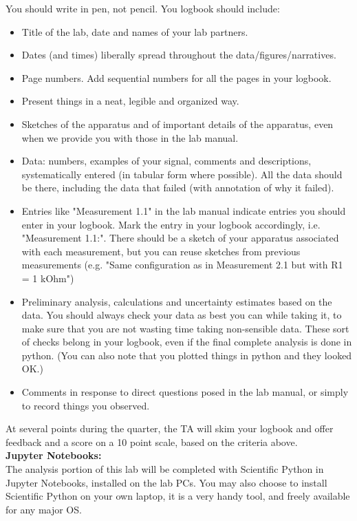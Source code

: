 \documentclass[12pt]{article}
\begin{document}
You should write in pen, not pencil.  You logbook should include:
\begin{itemize}
\item Title of the lab, date and names of your lab partners.  
\item Dates (and times) liberally spread throughout the data/figures/narratives.
\item Page numbers. Add sequential numbers for all the pages in your logbook. 
\item Present things in a neat, legible and organized way.
\item Sketches of the apparatus and of important details of the apparatus, even when we provide you with those in the lab manual.
\item Data: numbers, examples of your signal, comments and descriptions, systematically entered (in tabular form where possible). All the data should be there, including the data that failed (with annotation of why it failed). 
\item Entries like "Measurement 1.1" in the lab manual indicate entries you should enter in your logbook. Mark the entry in your logbook accordingly, i.e. "Measurement 1.1:".
There should be a sketch of your apparatus associated with each measurement, but you can reuse sketches from previous measurements (e.g. "Same configuration as in Measurement 2.1 but with R1 = 1 kOhm")
\item Preliminary analysis, calculations and uncertainty estimates based on the data.
You should always check your data as best you can while taking it, to make sure that you are not wasting time taking non-sensible data.  These sort of checks belong in your logbook, even if the final complete analysis is done in python.  (You can also note that you plotted things in python and they looked OK.)
\item Comments in response to direct questions posed in the lab manual, or simply to record things you observed.
\end{itemize}

At several points during the quarter, the TA will skim your logbook and offer feedback and a score on a 10 point scale, based on the criteria above.\\

\noindent
\textbf {Jupyter Notebooks:}\\ 
The analysis portion of this lab will be completed with Scientific Python in Jupyter Notebooks, installed on the lab PCs.  You may also choose to install Scientific Python on your own laptop, it is a very handy tool, and freely available for any major OS.
\end{document}

